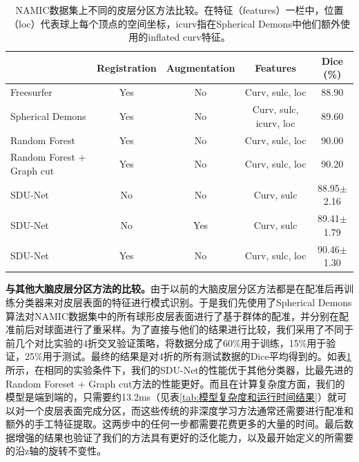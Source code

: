 \begin{table}[t]
		\caption{NAMIC数据集上不同的皮层分区方法比较。在特征（features）一栏中，位置（loc）代表球上每个顶点的空间坐标，icurv指在Spherical Demons中他们额外使用的inflated curv特征。}
		\label{tab:与其他脑皮层分区方法比较}
		\centering
		\begin{tabularx}{\linewidth}{l|c|c|c|c}
			\hline
			& Registration & Augmentation & Features &  Dice (\%) \\
			\hline
			Freesurfer \cite{desikan2006automated}         & Yes  & No   & Curv, sulc, loc                & 88.90 \\
			Spherical Demons \cite{yeo2009spherical}   & Yes  & No   & Curv, sulc, icurv, loc & 89.60  \\
			Random Forest \cite{meng2015automatic}      & Yes  & No   & Curv, sulc, loc                & 90.00  \\
			Random Forest + Graph cut \cite{meng2015automatic} & Yes & No & Curv, sulc, loc & 90.20 \\
			SDU-Net	 & No & No & Curv, sulc & 88.95$\pm$2.16 \\
			SDU-Net  & No & Yes & Curv, sulc & 89.41$\pm$1.79 \\
			SDU-Net	 & Yes & No & Curv, sulc, loc & 90.46$\pm$1.30 \\
			\hline 
		\end{tabularx}
\end{table}

\textbf{与其他大脑皮层分区方法的比较。}由于以前的大脑皮层分区方法\cite{yeo2009spherical,meng2015automatic,desikan2006automated}都是在配准后再训练分类器来对皮层表面的特征进行模式识别。于是我们先使用了Spherical Demons算法\cite{yeo2009spherical}对NAMIC数据集中的所有球形皮层表面进行了基于群体的配准，并分别在配准前后对球面进行了重采样。为了直接与他们的结果进行比较，我们采用了不同于前几个对比实验的4折交叉验证策略，将数据分成了60\%用于训练，15\%用于验证，25\%用于测试。最终的结果是对4折的所有测试数据的Dice平均得到的。如表\ref{tab:与其他脑皮层分区方法比较}所示，在相同的实验条件下，我们的SDU-Net的性能优于其他分类器，比最先进的Random Foreset + Graph cut\cite{meng2015automatic}方法的性能更好。而且在计算复杂度方面，我们的模型是端到端的，只需要约13.2ms（见表\ref{tab:模型复杂度和运行时间结果}）就可以对一个皮层表面完成分区，而这些传统的非深度学习方法通常还需要进行配准和额外的手工特征提取。这两步中的任何一步都需要花费更多的大量的时间。最后数据增强的结果也验证了我们的方法具有更好的泛化能力，以及最开始定义的所需要的沿z轴的旋转不变性。



